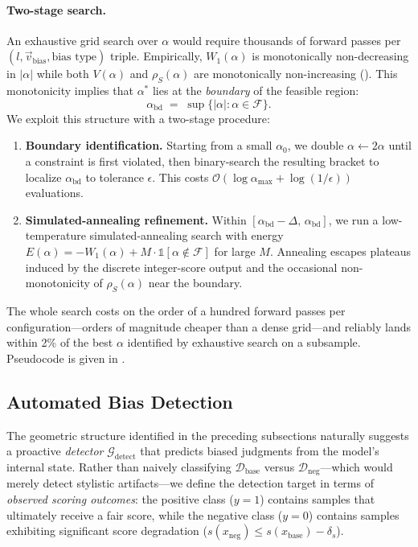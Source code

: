 \documentclass[11pt]{article}
\let\Cref\crtCref
\begin{document}
\paragraph{Two-stage search.}
An exhaustive grid search over $\alpha$ would require thousands of forward passes per $(l, \vec{v}_{\text{bias}}, \text{bias type})$ triple. Empirically, $W_1(\alpha)$ is monotonically non-decreasing in $|\alpha|$ while both $V(\alpha)$ and $\rho_S(\alpha)$ are monotonically non-increasing (\Cref{tab:alpha_monotone}). This monotonicity implies that $\alpha^{*}$ lies at the \emph{boundary} of the feasible region:
\begin{equation}
    \alpha_{\text{bd}} \;=\; \sup\bigl\{|\alpha| : \alpha \in \mathcal{F}\bigr\}.
\end{equation}
We exploit this structure with a two-stage procedure:
\begin{enumerate}[leftmargin=1.4em, nosep]
    \item \textbf{Boundary identification.} Starting from a small $\alpha_0$, we double $\alpha \leftarrow 2\alpha$ until a constraint is first violated, then binary-search the resulting bracket to localize $\alpha_{\text{bd}}$ to tolerance $\epsilon$. This costs $\mathcal{O}(\log \alpha_{\text{max}} + \log(1/\epsilon))$ evaluations.
    \item \textbf{Simulated-annealing refinement.} Within $[\alpha_{\text{bd}} - \Delta,\, \alpha_{\text{bd}}]$, we run a low-temperature simulated-annealing search with energy $E(\alpha) = -W_1(\alpha) + M \cdot \mathbb{1}[\alpha \notin \mathcal{F}]$ for large $M$. Annealing escapes plateaus induced by the discrete integer-score output and the occasional non-monotonicity of $\rho_S(\alpha)$ near the boundary.
\end{enumerate}
The whole search costs on the order of a hundred forward passes per configuration---orders of magnitude cheaper than a dense grid---and reliably lands within 2\% of the best $\alpha$ identified by exhaustive search on a subsample. Pseudocode is given in \Cref{alg:alpha_search}.


\subsection{Automated Bias Detection}
\label{subsec:detection_method}

The geometric structure identified in the preceding subsections naturally suggests a proactive \emph{detector} $\mathcal{G}_{\text{detect}}$ that predicts biased judgments from the model's internal state. Rather than naively classifying $\mathcal{D}_{\text{base}}$ versus $\mathcal{D}_{\text{neg}}$---which would merely detect stylistic artifacts---we define the detection target in terms of \emph{observed scoring outcomes}: the positive class ($y = 1$) contains samples that ultimately receive a fair score, while the negative class ($y = 0$) contains samples exhibiting significant score degradation ($s(x_{\text{neg}}) \le s(x_{\text{base}}) - \delta_s$).
\end{document}
